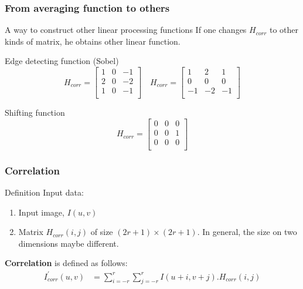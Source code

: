\documentclass[english,11pt,table,handout]{beamer}
\begin{document}
\frame
{
	\frametitle{From averaging function to others}
	\begin{block}{A way to construct other linear processing functions}
		If one changes $H_{corr}$ to other kinds of matrix, he obtains other linear function.
	\end{block}
	
	\begin{example}
	Edge detecting function (Sobel)
	$$
		H_{corr} = 
		\begin{bmatrix}
			1 & 0 & -1 \\
			2 & 0 & -2 \\
			1 & 0 & -1 \\
		\end{bmatrix}
		\quad 
		H_{corr} = 
		\begin{bmatrix}
			1 & 2 & 1 \\
			0 & 0 & 0 \\
			-1 & -2 & -1 \\
		\end{bmatrix}
	$$
	
	Shifting function
	$$
	H_{corr} = 
	\begin{bmatrix}
		0 & 0 & 0 \\
		0 & 0 & 1 \\
		0 & 0 & 0 \\
	\end{bmatrix}
	$$
	\end{example}
}


\frame
{
	\frametitle{Correlation}
	
	\begin{block}{Definition}
		Input data:
		\begin{enumerate}
			\item Input image, $I(u,v)$
			\item Matrix $H_{corr}{(i,j)}$ of size $(2r+1) \times (2r+1)$. In general, the size on two dimensions maybe different.
		\end{enumerate}
		\textbf{Correlation} is defined as follows:
		\begin{equation*} 
		\begin{split}
		I_{corr}^{'}{(u,v)} &= \sum_{i=-r}^{r}{\sum_{j=-r}^{r}{I(u+i, v+j).H_{corr}{(i,j)}}}
		\end{split}
		\end{equation*}
	\end{block}
}
\end{document}
